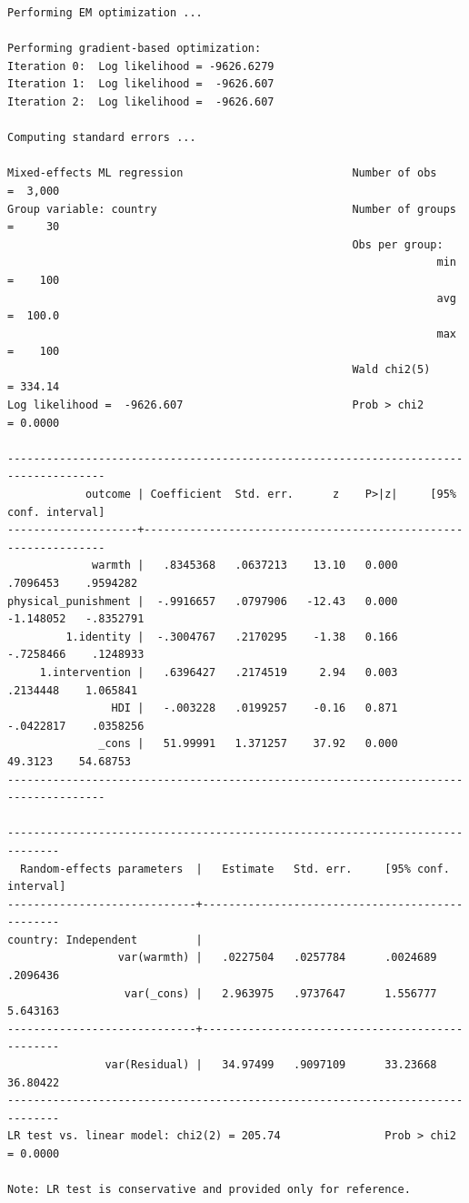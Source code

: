 \documentclass[
  letterpaper,
  DIV=11,
  numbers=noendperiod]{scrreprt}
\begin{document}
\begin{verbatim}
Performing EM optimization ...

Performing gradient-based optimization: 
Iteration 0:  Log likelihood = -9626.6279  
Iteration 1:  Log likelihood =  -9626.607  
Iteration 2:  Log likelihood =  -9626.607  

Computing standard errors ...

Mixed-effects ML regression                          Number of obs    =  3,000
Group variable: country                              Number of groups =     30
                                                     Obs per group:
                                                                  min =    100
                                                                  avg =  100.0
                                                                  max =    100
                                                     Wald chi2(5)     = 334.14
Log likelihood =  -9626.607                          Prob > chi2      = 0.0000

-------------------------------------------------------------------------------------
            outcome | Coefficient  Std. err.      z    P>|z|     [95% conf. interval]
--------------------+----------------------------------------------------------------
             warmth |   .8345368   .0637213    13.10   0.000     .7096453    .9594282
physical_punishment |  -.9916657   .0797906   -12.43   0.000    -1.148052   -.8352791
         1.identity |  -.3004767   .2170295    -1.38   0.166    -.7258466    .1248933
     1.intervention |   .6396427   .2174519     2.94   0.003     .2134448    1.065841
                HDI |   -.003228   .0199257    -0.16   0.871    -.0422817    .0358256
              _cons |   51.99991   1.371257    37.92   0.000      49.3123    54.68753
-------------------------------------------------------------------------------------

------------------------------------------------------------------------------
  Random-effects parameters  |   Estimate   Std. err.     [95% conf. interval]
-----------------------------+------------------------------------------------
country: Independent         |
                 var(warmth) |   .0227504   .0257784      .0024689    .2096436
                  var(_cons) |   2.963975   .9737647      1.556777    5.643163
-----------------------------+------------------------------------------------
               var(Residual) |   34.97499   .9097109      33.23668    36.80422
------------------------------------------------------------------------------
LR test vs. linear model: chi2(2) = 205.74                Prob > chi2 = 0.0000

Note: LR test is conservative and provided only for reference.
\end{verbatim}
\end{document}
